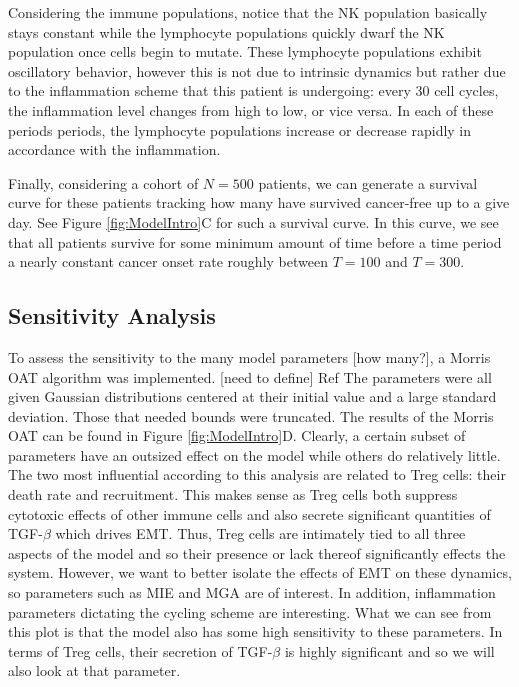 \documentclass{article}
\begin{document}
Considering the immune populations, notice that the NK population basically stays constant while the lymphocyte populations quickly dwarf the NK population once cells begin to mutate.
These lymphocyte populations exhibit oscillatory behavior, however this is not due to intrinsic dynamics but rather due to the inflammation scheme that this patient is undergoing: every 30 cell cycles, the inflammation level changes from high to low, or vice versa. In each of these periods periods, the lymphocyte populations increase or decrease rapidly in accordance with the inflammation.

Finally, considering a cohort of $N=500$ patients, we can generate a survival curve for these patients tracking how many have survived cancer-free up to a give day.
See Figure \ref{fig:ModelIntro}C for such a survival curve.
In this curve, we see that all patients survive for some minimum amount of time before a time period a nearly constant cancer onset rate roughly between $T = 100$ and $T = 300$.

\subsection{Sensitivity Analysis}\label{SensAnalysis}
To assess the sensitivity to the many model parameters [how many?], a Morris OAT algorithm was implemented. [need to define] Ref 
The parameters were all given Gaussian distributions centered at their initial value and a large standard deviation.
Those that needed bounds were truncated.
The results of the Morris OAT can be found in Figure \ref{fig:ModelIntro}D.
Clearly, a certain subset of parameters have an outsized effect on the model while others do relatively little.
The two most influential according to this analysis are related to Treg cells: their death rate and recruitment.
This makes sense as Treg cells both suppress cytotoxic effects of other immune cells and also secrete significant quantities of TGF-$\beta$ which drives EMT.
Thus, Treg cells are intimately tied to all three aspects of the model and so their presence or lack thereof significantly effects the system.
However, we want to better isolate the effects of EMT on these dynamics, so parameters such as MIE and MGA are of interest.
In addition, inflammation parameters dictating the cycling scheme are interesting.
What we can see from this plot is that the model also has some high sensitivity to these parameters.
In terms of Treg cells, their secretion of TGF-$\beta$ is highly significant and so we will also look at that parameter.
\end{document}
